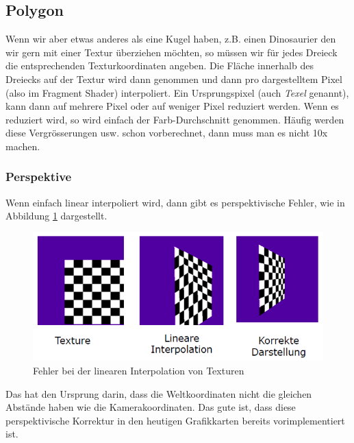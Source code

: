 \subsection{Polygon}
Wenn wir aber etwas anderes als eine Kugel haben, z.B. einen Dinosaurier den wir gern mit einer Textur überziehen möchten, so müssen wir für jedes Dreieck die entsprechenden Texturkoordinaten angeben. Die Fläche innerhalb des Dreiecks auf der Textur wird dann genommen und dann pro dargestelltem Pixel (also im Fragment Shader) interpoliert. Ein Ursprungspixel (auch \textit{Texel} genannt), kann dann auf mehrere Pixel oder auf weniger Pixel reduziert werden. Wenn es reduziert wird, so wird einfach der Farb-Durchschnitt genommen. Häufig werden diese Vergrösserungen usw. schon vorberechnet, dann muss man es nicht 10x machen.

\subsubsection{Perspektive}
Wenn einfach linear interpoliert wird, dann gibt es perspektivische Fehler, wie in Abbildung \ref{fig:perspektive} dargestellt.
\begin{figure}[!ht]
	\centering
	\includegraphics[width=0.4\linewidth]{fig/perspektive}
	\caption{Fehler bei der linearen Interpolation von Texturen}
	\label{fig:perspektive}
\end{figure}
Das hat den Ursprung darin, dass die Weltkoordinaten nicht die gleichen Abstände haben wie die Kamerakoordinaten. Das gute ist, dass diese perspektivische Korrektur in den heutigen Grafikkarten bereits vorimplementiert ist.

